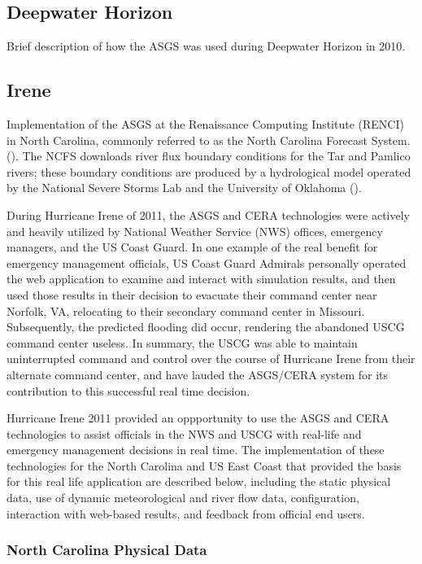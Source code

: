 \documentclass[12pt]{article}
\begin{document}
\subsection{Deepwater Horizon}

Brief description of how the ASGS was used during Deepwater Horizon in 2010.

\subsection{Irene}

Implementation of the ASGS at the Renaissance Computing Institute 
(RENCI) in North Carolina, commonly referred to as the North 
Carolina Forecast System. (\cite{BlantonBO2012}). The NCFS downloads 
river flux boundary conditions for the Tar and Pamlico rivers; these 
boundary conditions are produced by a hydrological model operated by 
the National Severe Storms Lab and the University of Oklahoma (\cite
{VanCootenS2011}). 

During Hurricane Irene of 2011, the ASGS and CERA technologies were 
actively and heavily utilized by National Weather Service (NWS) 
offices, emergency managers, and the US Coast Guard. In one example 
of the real benefit for emergency management officials, US Coast 
Guard Admirals personally operated the web application to examine 
and interact with simulation results, and then used those results in 
their decision to evacuate their command center near Norfolk, VA, 
relocating to their secondary command center in Missouri. 
Subsequently, the predicted flooding did occur, rendering the 
abandoned USCG command center useless. In summary, the USCG was able 
to maintain uninterrupted command and control over the course of 
Hurricane Irene from their alternate command center, and have lauded 
the ASGS/CERA system for its contribution to this successful 
real time decision.

Hurricane Irene 2011 provided an oppportunity to use the ASGS and 
CERA technologies to assist officials in the NWS and USCG with 
real-life and emergency management decisions in real time. The 
implementation of these technologies for the North Carolina and US 
East Coast that provided the basis for this real life application 
are described below, including the static physical data, use of 
dynamic meteorological and river flow data, configuration, 
interaction with web-based results, and feedback from official end 
users. 

\subsubsection{North Carolina Physical Data}
\end{document}
